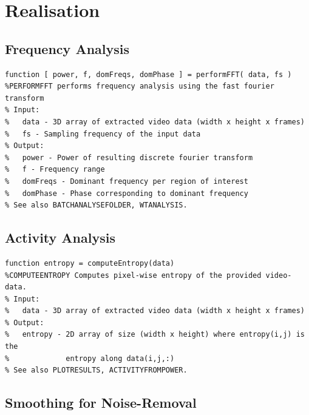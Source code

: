 \documentclass[11pt]{scrartcl}
\begin{document}

\section{Realisation} 

\subsection{Frequency Analysis}

\begin{minipage}{\linewidth}
  \begin{lstlisting}[caption={Function performing the frequency analysis using the FFT.}, label=list:res]
function [ power, f, domFreqs, domPhase ] = performFFT( data, fs )
%PERFORMFFT performs frequency analysis using the fast fourier transform
% Input:
%   data - 3D array of extracted video data (width x height x frames)
%   fs - Sampling frequency of the input data
% Output:
%   power - Power of resulting discrete fourier transform
%   f - Frequency range
%   domFreqs - Dominant frequency per region of interest 
%   domPhase - Phase corresponding to dominant frequency
% See also BATCHANALYSEFOLDER, WTANALYSIS.
  \end{lstlisting}
\end{minipage}



\subsection{Activity Analysis}

\begin{minipage}{\linewidth}
  \begin{lstlisting}[caption={Function performing the activity analysis using entropy.}, label=list:res]
function entropy = computeEntropy(data) 
%COMPUTEENTROPY Computes pixel-wise entropy of the provided video-data.
% Input:
%   data - 3D array of extracted video data (width x height x frames)
% Output:
%   entropy - 2D array of size (width x height) where entropy(i,j) is the
%             entropy along data(i,j,:)
% See also PLOTRESULTS, ACTIVITYFROMPOWER.
  \end{lstlisting}
\end{minipage}

\subsection{Smoothing for Noise-Removal}
\end{document}
